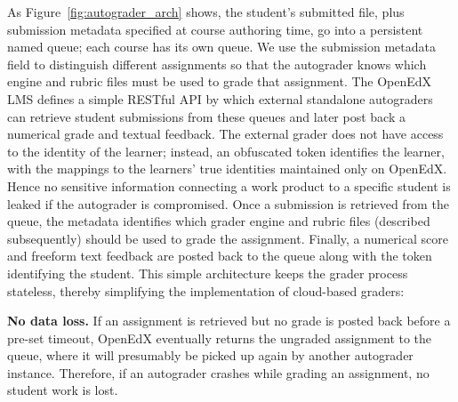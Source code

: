 As Figure~\ref{fig:autograder_arch} shows, 
the student's submitted file, plus
submission metadata specified at course authoring time, go into a
persistent named queue; each course has its own queue.
We use the submission metadata field to distinguish different
assignments so that the autograder knows which engine and rubric files
must be used to grade that assignment.
The OpenEdX LMS defines a simple RESTful
API
by which external standalone autograders can retrieve student
submissions from these queues and later post back a numerical grade and
textual feedback.
The external grader does not have access to the identity of the learner;
instead, an obfuscated token identifies the learner, with the mappings
to the learners' true identities maintained only on OpenEdX.
Hence no sensitive information connecting a work product to a specific
student is leaked if the autograder is compromised.
Once a submission is retrieved from the queue, the metadata identifies
which grader engine and rubric files (described subsequently) should be
used to grade the assignment.  Finally, a numerical score and freeform
text feedback are posted back to the queue along with the token
identifying the student.
This simple architecture keeps the grader process stateless, thereby 
simplifying the implementation of cloud-based graders:

\textbf{No data loss.}
If an assignment is retrieved but no grade is posted back before
a pre-set timeout, OpenEdX eventually returns the ungraded assignment to
the queue, where it will presumably be picked up again by another
autograder instance.
Therefore, if an autograder crashes while grading an assignment, no
student work is lost.

